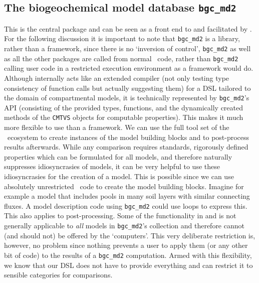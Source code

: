 \subsection{The biogeochemical model database \texttt{bgc\_md2}} This is the
central package and can be seen as a front end to \CompartmentalSystems{} and
\LAPM{} facilitated by \ComputabilityGraphs{}.  For the following discussion it is
important to note that \texttt{bgc\_md2} is a library, rather than a framework,
since there is no `inversion of control', \ie \texttt{bgc\_md2} as well as all
the other packages are called from normal \python\ code, rather than
\texttt{bgc\_md2} calling user code in a restricted execution environment as a
framework would do.  Although internally \ComputabilityGraphs{} acts like an
extended  compiler  (not only testing type consistency of function calls but
actually suggesting them) for a DSL tailored to the domain of compartmental
models, it is technically represented by \texttt{bgc\_md2}'s API (consisting of
the provided types, functions, and the dynamically created methods of the
\texttt{CMTVS} objects for computable properties).  This makes it much more
flexible to use than a framework. We can use the full tool set of the
\python\ ecosystem to create instances of the model building blocks and to
post-process results afterwards.  While any comparison requires standards, \ie
rigorously defined properties which can be formulated for all models, and
therefore naturally suppresses idiosyncrasies of models, it can be very helpful
to use these idiosyncrasies for the creation of a model.  This is possible
since we can use absolutely unrestricted \python\ code to create the model
building blocks.  Imagine for example a model that includes pools in many soil
layers with similar connecting fluxes. A model description code using
\texttt{bgc\_md2} could use loops to express this.  This also applies to
post-processing. Some of the functionality in \LAPM{} and \CompartmentalSystems{} is
not generally applicable to \emph{all} models in \texttt{bgc\_md2}'s collection
and therefore cannot (and should not) 
be offered by the `computers'. 
This very deliberate restriction is, however, no problem since 
nothing prevents a user to apply them (or any other bit of code) to the results of a
\texttt{bgc\_md2} computation.  
Armed with this flexibility, we know that our
DSL does not have to provide everything and can restrict it  to sensible categories
for comparisons.
